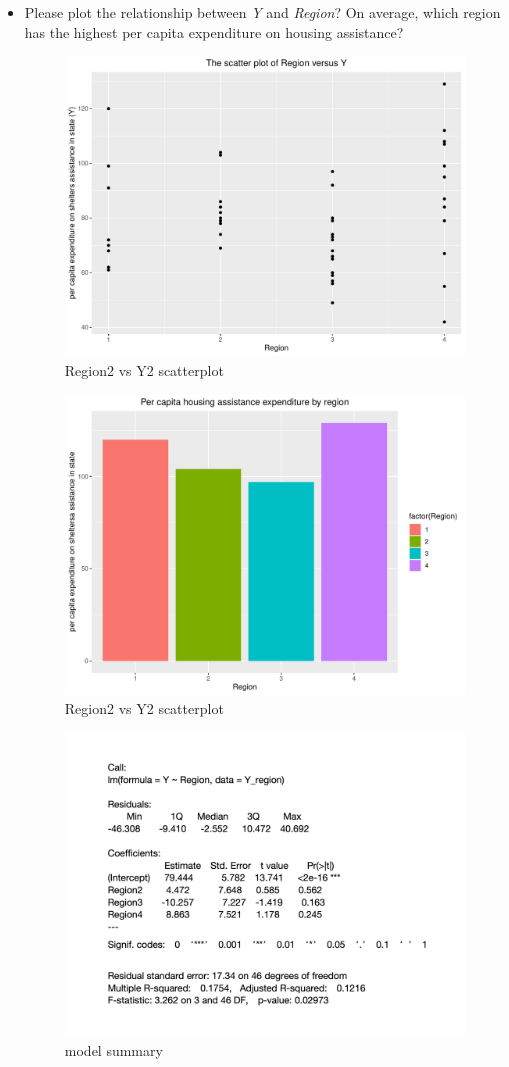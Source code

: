 \documentclass[12pt,letterpaper]{article}
\begin{document}
\begin{itemize}
\item
Please plot the relationship between \emph{Y} and \emph{Region}? On average, which region has the highest per capita expenditure on housing assistance?

\vspace{5cm}
\begin{figure}[h!]\centering
	\caption{\footnotesize Region2 vs Y2 scatterplot}
	\label{fig:Region2_vs_Y2}
	\includegraphics[width=.75\textwidth]{Region2_vs_Y2_scatterplot.pdf}
\end{figure}
\begin{figure}[h!]\centering
	\caption{\footnotesize Region2 vs Y2 scatterplot}
	\label{fig:Region1_vs_Y1}
	\includegraphics[width=.75\textwidth]{Region1_vs_Y1_barchart.pdf}
\end{figure}
\begin{figure}[h!]\centering
	\caption{\footnotesize model summary}
	\label{fig:regression model}
	\includegraphics[width=.75\textwidth]{model.png}

\end{figure}
\end{itemize}
\end{document}
